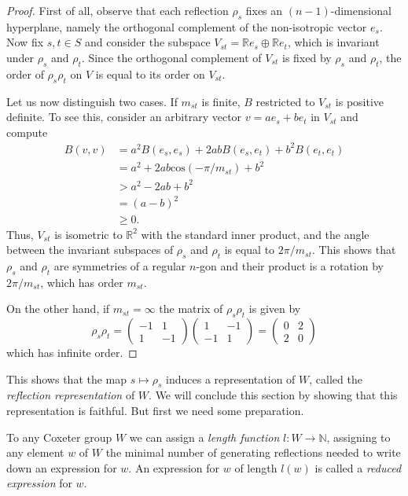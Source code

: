 \documentclass{article}
\theoremstyle{definition}
\begin{document}
\begin{proof}
First of all, observe that each reflection $\rho_s$ fixes an $(n-1)$-dimensional hyperplane, namely the orthogonal complement of the non-isotropic vector $e_s$. Now fix $s,t\in S$ and consider the subspace $V_{st} = \mathbb{R}e_s \oplus \mathbb{R}e_t$, which is invariant under $\rho_s$ and $\rho_t$. Since the orthogonal complement of $V_{st}$ is fixed by $\rho_s$ and $\rho_t$, the order of $\rho_s\rho_t$ on $V$ is equal to its order on $V_{st}$.

Let us now distinguish two cases. If $m_{st}$ is finite, $B$ restricted to $V_{st}$ is positive definite. To see this, consider an arbitrary vector $v = ae_s + b e_t$ in $V_{st}$ and compute
\begin{align*}
B(v, v) & = a^2B(e_s, e_s) + 2abB(e_s, e_t) + b^2B(e_t, e_t)\\
& = a^2 + 2ab\text{cos}( -\pi / m_{st} ) + b^2 \\
& > a^2 - 2ab + b^2 \\
& = (a - b)^2 \\
& \geq 0.
\end{align*}
Thus, $V_{st}$ is isometric to $\mathbb{R}^2$ with the standard inner product, and the angle between the invariant subspaces of $\rho_s$ and $\rho_t$ is equal to $2 \pi / m_{st}$. This shows that $\rho_s$ and $\rho_t$ are symmetries of a regular $n$-gon and their product is a rotation by $2\pi/m_{st}$, which has order $m_{st}$.

On the other hand, if $m_{st} = \infty$ the matrix of $\rho_s\rho_t$ is given by
$$\rho_s \rho_t = \left( \begin{matrix}
-1 & 1 \\ 1 & -1
\end{matrix} \right)
\left( \begin{matrix}
1 & -1 \\ -1 & 1
\end{matrix} \right)
= \left( \begin{matrix}
0 & 2 \\ 2 & 0
\end{matrix} \right)
$$
which has infinite order.
\end{proof}

This shows that the map $s \mapsto \rho_s$ induces a representation of $W$, called the \textit{reflection representation} of $W$. We will conclude this section by showing that this representation is faithful. But first we need some preparation.

To any Coxeter group $W$ we can assign a \textit{length function} $l: W \rightarrow \mathbb{N}$, assigning to any element $w$ of $W$ the minimal number of generating reflections needed to write down an expression for $w$. An expression for $w$ of length $l(w)$ is called a \textit{reduced expression} for $w$.
\end{document}
